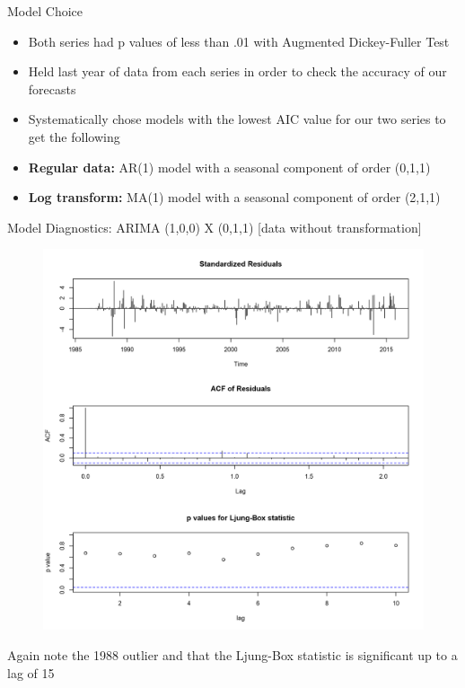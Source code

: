 \documentclass[xcolor=dvipsnames]{beamer}
\begin{document}
\begin{frame}{Model Choice}
\begin{itemize}
\item Both series had p values of less than .01 with Augmented Dickey-Fuller Test
\item Held last year of data from each series in order to check the accuracy of our forecasts
\item Systematically chose models with the lowest AIC value for our two series to get the following
\item \textbf{Regular data: } AR(1) model with a seasonal component of order (0,1,1) 
\item \textbf{Log transform:} MA(1) model with a seasonal component of  order (2,1,1)

\end{itemize}
\end{frame}


\begin{frame}{Model Diagnostics: ARIMA (1,0,0) X (0,1,1) [data without transformation]}
\begin{figure}
\centering\includegraphics[width=.48\linewidth]{../normalplots/tsdiag-fitV-plot.png}
\end{figure}

\vfill 
\footnotesize Again note the 1988 outlier and that the Ljung-Box statistic is significant up to a lag of 15 

\end{frame}
\end{document}
